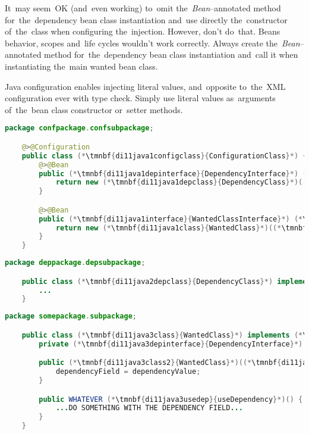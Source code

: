 \warning It~may seem~OK (and~even working) to~omit the~\textit{Bean}--annotated method for~the~dependency bean class instantiation and~use directly the~constructor of~the~class when configuring the~injection.
However, don't do~that.
Beans behavior, scopes and~life cycles wouldn't work correctly.
Always create the~\textit{Bean}--annotated method for~the~dependency bean class instantiation and~call it when instantiating the~main wanted bean class.

\note Java configuration enables injecting literal values, and~opposite to~the~XML configuration ever with type check.
Simply use literal values as~arguments of~the~bean class constructor or~setter methods.
\newpage

\emten
{}%
\begin{lstlisting}[language=Java, title={Configuration class}]
    package confpackage.confsubpackage;

    @>@Configuration
    public class (*\tmnbf{di11java1configclass}{ConfigurationClass}*) {
        @>@Bean
        public (*\tmnbf{di11java1depinterface}{DependencyInterface}*) (*\tmnbf{di11java1depbeanid}{dependencyBeanMethod}*)() {
            return new (*\tmnbf{di11java1depclass}{DependencyClass}*)(...);
        }

        @>@Bean
        public (*\tmnbf{di11java1interface}{WantedClassInterface}*) (*\tmnbf{di11java1beanid}{wantedBeanMethod}*)() {
            return new (*\tmnbf{di11java1class}{WantedClass}*)((*\tmnbf{di11java1depbeanid2}{dependencyBeanMethod}*)());
        }
    }
\end{lstlisting}
\begin{lstlisting}[language=Java, title={Dependency class}]
    package deppackage.depsubpackage;

    public class (*\tmnbf{di11java2depclass}{DependencyClass}*) implements (*\tmnbf{di11java2depinterface}{DependencyInterface}*) {
        ...
    }
\end{lstlisting}
\begin{lstlisting}[language=Java, title={Wanted class with the constructor}]
    package somepackage.subpackage;

    public class (*\tmnbf{di11java3class}{WantedClass}*) implements (*\tmnbf{di11java3interface}{WantedClassInterface}*) {
        private (*\tmnbf{di11java3depinterface}{DependencyInterface}*) dependencyField;

        public (*\tmnbf{di11java3class2}{WantedClass}*)((*\tmnbf{di11java3depinterface2}{DependencyInterface}*) dependencyValue) {
            dependencyField = dependencyValue;
        }

        public WHATEVER (*\tmnbf{di11java3usedep}{useDependency}*)() {
            ...DO SOMETHING WITH THE DEPENDENCY FIELD...
        }
    }
\end{lstlisting}
